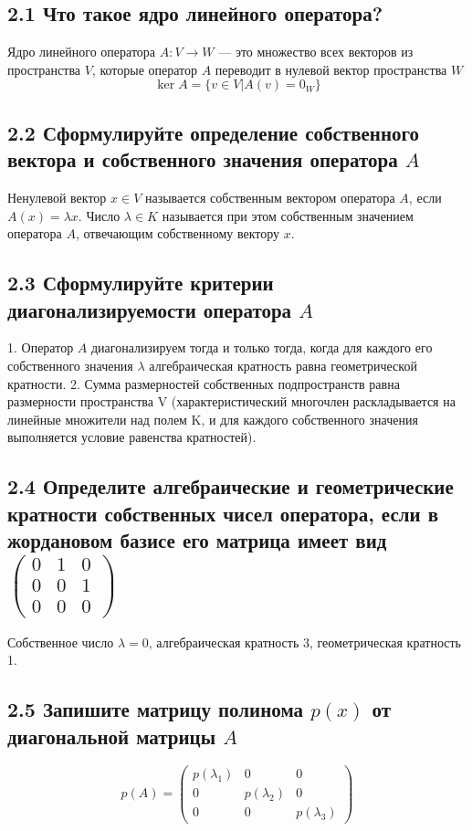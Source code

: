 \documentclass{article}
\begin{document}
\subsection*{2.1 Что такое ядро линейного оператора?}
Ядро линейного оператора \( A : V \rightarrow W \) — это множество всех векторов из пространства \( V \), которые оператор \( A \) переводит в нулевой вектор пространства \( W \)
\[\ker A = \{v \in V | A(v) = 0_W\}\]

\subsection*{2.2 Сформулируйте определение собственного вектора и собственного значения оператора \( A \)}
Ненулевой вектор \( x \in V \) называется собственным вектором оператора \( A \), если \( A(x) = \lambda x \). Число \( \lambda \in K \) называется при этом собственным значением оператора \( A \), отвечающим собственному вектору \( x \).

\subsection*{2.3 Сформулируйте критерии диагонализируемости оператора \( A \)}
1. Оператор \( A \) диагонализируем тогда и только тогда, когда для каждого его собственного значения \( \lambda \) алгебраическая кратность равна геометрической кратности.
2. Сумма размерностей собственных подпространств равна размерности пространства V (характеристический многочлен раскладывается на линейные множители над полем K, и для каждого собственного значения выполняется условие равенства кратностей).

\subsection*{2.4 Определите алгебраические и геометрические кратности собственных чисел оператора, если в жордановом базисе его матрица имеет вид \( \begin{pmatrix} 0 & 1 & 0 \\ 0 & 0 & 1 \\ 0 & 0 & 0 \end{pmatrix} \)}
Собственное число \( \lambda = 0 \), алгебраическая кратность 3, геометрическая кратность 1.

\subsection*{2.5 Запишите матрицу полинома \( p(x) \) от диагональной матрицы \( A \)}
\[p(A) = \begin{pmatrix}
p(\lambda_1) & 0 & 0 \\
0 & p(\lambda_2) & 0 \\
0 & 0 & p(\lambda_3)
\end{pmatrix}\]
\end{document}
